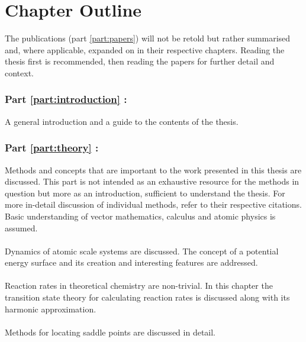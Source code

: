 \section{Chapter Outline}
\label{sec:chapters}

The publications (part \ref{part:papers}) will not be retold but rather summarised and, where applicable, expanded on in their respective chapters.
Reading the thesis first is recommended, then reading the papers for further detail and context.

\subsubsection{Part \ref{part:introduction} : }
A general introduction and a guide to the contents of the thesis.

\subsubsection{Part \ref{part:theory} : }
Methods and concepts that are important to the work presented in this thesis are discussed.
This part is not intended as an exhaustive resource for the methods in question but more as an introduction, sufficient to understand the thesis.
For more in-detail discussion of individual methods, refer to their respective citations.
Basic understanding of vector mathematics, calculus and atomic physics is assumed.

\paragraph{}
Dynamics of atomic scale systems are discussed.
The concept of a potential energy surface and its creation and interesting features are addressed.

\paragraph{}
Reaction rates in theoretical chemistry are non-trivial.
In this chapter the transition state theory for calculating reaction rates is discussed along with its harmonic approximation.

\paragraph{}
Methods for locating saddle points are discussed in detail.

